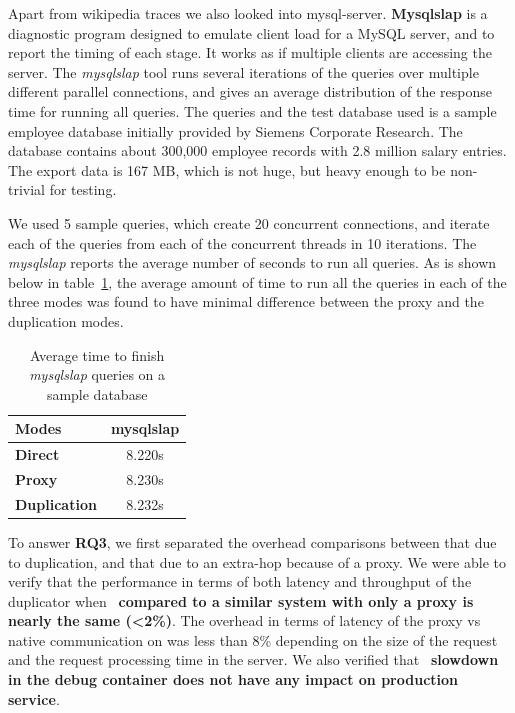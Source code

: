 Apart from wikipedia traces we also looked into mysql-server. 
\textbf{Mysqlslap} is a diagnostic program designed to emulate client load for a MySQL server, and to report the timing of each stage. 
It works as if multiple clients are accessing the server. The \emph{mysqlslap} tool runs several iterations of the queries over multiple different parallel connections, and gives an average distribution of the response time for running all queries.
The queries and the test database used is a sample employee database initially provided by Siemens Corporate Research. 
The database contains about 300,000 employee records with 2.8 million salary entries. The export data is 167 MB, which is not huge, but heavy enough to be non-trivial for testing.

We used 5 sample queries, which create 20 concurrent connections, and iterate each of the queries from each of the concurrent threads in 10 iterations.
The \emph{mysqlslap} reports the average number of seconds to run all queries. As is shown below in table~\ref{tab:mysqlslap}, the average amount of time to run all the queries in each of the three modes was found to have minimal difference between the proxy and the duplication modes.

\begin{table}
	\centering
\begin{center}
	\begin{tabular}{l c}
	\toprule
	\textbf{Modes} & \textbf{mysqlslap}\\
	\midrule
	\textbf{Direct} & 8.220s \\
	\textbf{Proxy} & 8.230s \\
	\textbf{Duplication} & 8.232s \\
	\bottomrule
	\end{tabular}
\end{center}
\caption{Average time to finish \emph{mysqlslap} queries on a sample database}
\label{tab:mysqlslap}
\end{table}   

\begin{tcolorbox}
	To answer \textbf{RQ3}, we first separated the overhead comparisons between that due to duplication, and that due to an extra-hop because of a proxy. We were able to verify that the performance in terms of both latency and throughput of the duplicator when ~\textbf{compared to a similar system with only a proxy is nearly the same (\textless 2\%)}. The overhead in terms of latency of the proxy vs native communication on was less than 8\% depending on the size of the request and the request processing time in the server. We also verified that ~\textbf{slowdown in the debug container does not have any impact on production service}. 
\end{tcolorbox}
